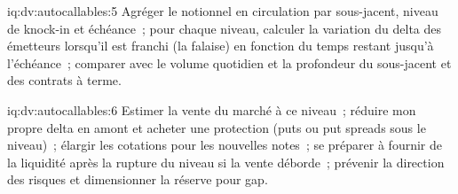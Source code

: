 \begin{solution}{iq:dv:autocallables:5}
Agréger le notionnel en circulation par sous-jacent, niveau de knock-in et échéance~; pour chaque niveau, calculer la variation du delta des émetteurs lorsqu'il est
franchi (la falaise) en fonction du temps restant jusqu'à l'échéance~; comparer avec le volume quotidien et la profondeur du sous-jacent et des contrats à terme.
\end{solution}

\begin{solution}{iq:dv:autocallables:6}
Estimer la vente du marché à ce niveau~; réduire mon propre delta en amont et acheter une protection (puts ou put spreads sous le niveau)~; élargir les cotations
pour les nouvelles notes~; se préparer à fournir de la liquidité après la rupture du niveau si la vente déborde~; prévenir la direction des risques et dimensionner la réserve pour gap.
\end{solution}
